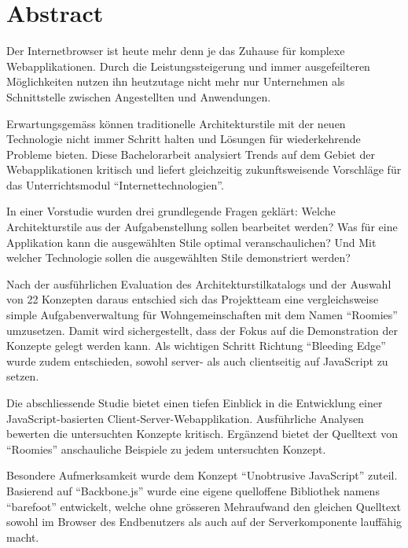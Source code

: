 \clearpage
\thispagestyle{empty}

\section*{Abstract}

Der Internetbrowser ist heute mehr denn je das Zuhause für komplexe Webapplikationen. Durch die Leistungssteigerung und immer ausgefeilteren Möglichkeiten nutzen ihn heutzutage nicht mehr nur Unternehmen als Schnittstelle zwischen Angestellten und Anwendungen.

Erwartungsgemäss können traditionelle Architekturstile mit der neuen Technologie nicht immer Schritt halten und Lösungen für wiederkehrende Probleme bieten. Diese Bachelorarbeit analysiert Trends auf dem Gebiet der Webapplikationen kritisch und liefert gleichzeitig zukunftsweisende Vorschläge für das Unterrichtsmodul ``Internettechnologien''.

In einer Vorstudie wurden drei grundlegende Fragen geklärt: Welche Architekturstile aus der Aufgabenstellung sollen bearbeitet werden? Was für eine Applikation kann die ausgewählten Stile optimal veranschaulichen? Und Mit welcher Technologie sollen die ausgewählten Stile demonstriert werden?

Nach der ausführlichen Evaluation des Architekturstilkatalogs und der Auswahl von 22 Konzepten daraus entschied sich das Projektteam eine vergleichsweise simple Aufgabenverwaltung für Wohngemeinschaften mit dem Namen ``Roomies'' umzusetzen. Damit wird sichergestellt, dass der Fokus auf die Demonstration der Konzepte gelegt werden kann. Als wichtigen Schritt Richtung ``Bleeding Edge'' wurde zudem entschieden, sowohl server- als auch clientseitig auf JavaScript zu setzen.

Die abschliessende Studie bietet einen tiefen Einblick in die Entwicklung einer JavaScript-basierten Client-Server-Webapplikation. Ausführliche Analysen bewerten die untersuchten Konzepte kritisch. Ergänzend bietet der Quelltext von ``Roomies'' anschauliche Beispiele zu jedem untersuchten Konzept.

Besondere Aufmerksamkeit wurde dem Konzept ``Unobtrusive JavaScript'' zuteil. Basierend auf ``Backbone.js'' wurde eine eigene quelloffene Bibliothek namens ``barefoot'' entwickelt, welche ohne grösseren Mehraufwand den gleichen Quelltext sowohl im Browser des Endbenutzers als auch auf der Serverkomponente lauffähig macht.

\clearpage
